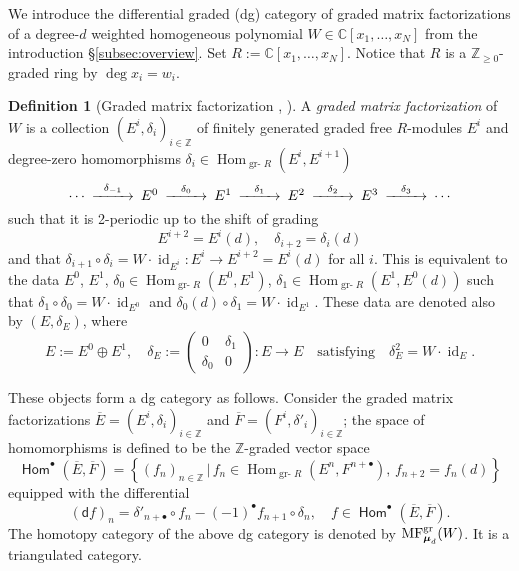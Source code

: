 \documentclass[11pt]{amsart}
\theoremstyle{definition} %
\newtheorem{defn}[thm]{Definition} %
\theoremstyle{remark} %
\newcommand{\CC}{\mathbb C}
\newcommand{\ZZ}{\mathbb Z}
\newcommand{\id}{\operatorname{id}}
\newcommand{\gr}{\operatorname{gr-}}
\newcommand{\Hom}{\operatorname{Hom}}
\def\MF{\operatorname{\mathsf{MF}}}
\def\MFhom{\operatorname{{MF}}}
\newcommand{\bmu}{\boldsymbol{\mu}}
\newcommand{\dd}{\mathsf{d}}
\newcommand{\sfHom}{\operatorname{\mathsf{Hom}}}
\newcommand{\ov}{\overline}
\begin{document}
We introduce the differential graded (dg) category 
of graded matrix factorizations of a degree-$d$ 
weighted homogeneous polynomial $W \in \CC[x_1,\dots,x_N]$ 
from the introduction \S \ref{subsec:overview}.  
Set $R := \CC[x_1,\dots,x_N]$. 
Notice that $R$ is a $\ZZ_{\ge 0}$-graded ring 
by $\deg x_i = w_i$. 

\begin{defn}[Graded matrix factorization 
{\cite{Walcher, Hori-Walcher:F-term}, 
\cite[\S 3.1]{Orlov:equivalence}}]
\label{defn:grMFjsigma}
A \emph{graded matrix factorization} of $W$ 
is a collection $(E^i,\delta_i)_{i\in \ZZ}$ 
of finitely generated graded free $R$-modules $E^i$ 
and degree-zero homomorphisms 
$\delta_i\in \Hom_{{\gr}R}(E^i,E^{i+1})$ 
\[
\begin{CD} 
\cdots @>{\delta_{-1}}>> E^0 @>{\delta_0}>> E^1 
@>{\delta_1}>> E^2 
@>{\delta_2}>> E^3 @>{\delta_3}>> \cdots 
\end{CD}    
\]
such that it is 2-periodic up to the shift of grading 
\[ 
E^{i+2}=E^i(d), \quad \delta_{i+2}=\delta_i(d)
\]
and that 
$\delta_{i+1}\circ \delta_{i} = 
W \cdot \id_{E^i}\colon E^i\to E^{i+2} = E^i(d)$ for all $i$.   
This is equivalent to the data $E^0$, $E^1$, 
$\delta_0\in \Hom_{{\gr}R}(E^0,E^1)$, 
$\delta_1\in\Hom_{{\gr}R}(E^1,E^0(d))$ 
such that $\delta_1\circ\delta_0=W\cdot \id_{E^0}$ 
and $\delta_0(d) \circ \delta_1=W\cdot \id_{E^1}$. 
These data are denoted also by $(E,\delta_E)$, 
where 
\[
E:= E^0 \oplus E^1, \quad 
\delta_E := 
\begin{pmatrix}
0 & \delta_1 \\ 
\delta_0 & 0 
\end{pmatrix} \colon E \to E \quad 
\text{satisfying} \quad \delta_E^2 = W \cdot \id_E. 
\]

These objects form a dg category as follows.
Consider the graded matrix factorizations 
$\ov{E}=(E^i,\delta_{i})_{i\in \ZZ}$ and 
$\ov{F}=(F^i,\delta'_{i})_{i\in \ZZ}$; 
the space of homomorphisms is defined to be 
the $\ZZ$-graded vector space 
\[
\sfHom^\bullet(\ov{E},\ov{F}) 
= \left\{ (f_n)_{n\in \ZZ} \,\Big|\, f_n\in 
\Hom_{{\gr}R}(E^n,F^{n+\bullet}), \, 
f_{n+2} = f_n(d) \right\} 
\] 
equipped with the differential 
\[
(\dd f)_n = \delta'_{n+\bullet} \circ f_n - (-1)^{\bullet}
f_{n+1} \circ \delta_{n}, \quad 
f\in \sfHom^\bullet(\ov{E},\ov{F}). 
\]
The homotopy category of the above 
dg category is denoted by $\MFhom^{\rm gr}_{\bmu_d}(W)$. 
It is a triangulated category.  
\end{defn}
\end{document}
